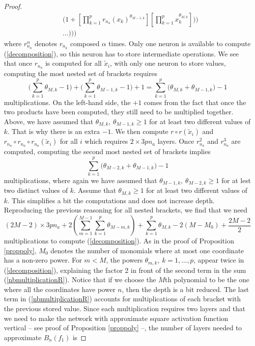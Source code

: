 \documentclass[anon,12pt]{colt2021} %
\begin{document}
\begin{proof}
\begin{align}
    & \bigg( 1 + \left[\prod_{k=1}^{p} r_{n_{a}}(x_{k})^{\theta_{M-1,k}} \right] \left[\prod_{k=1}^{p} x_{k}^{\theta_{M,k}} \right] \bigg)\bigg) \nonumber \\
    & \dots \bigg) \bigg) \bigg) \nonumber
\end{align}
where $r_{n_{a}}^{\alpha}$ denotes $r_{n_{a}}$ composed $\alpha$ times. Only one neuron is available to compute (\ref{decomposition}), so this neuron has to store intermediate operations. We see that once $r_{n_{a}}$ is computed for all $\tilde x_{i}$, with only one neuron to store values, computing the most nested set of brackets requires
\begin{equation*}
    \big( \sum_{k=1}^{p}\theta_{M,k} - 1 \big) + \big( \sum_{k=1}^{p}\theta_{M-1,k} -1 \big) +1 =  \sum_{k=1}^{p} \big( \theta_{M,k} + \theta_{M-1,k} \big) - 1
\end{equation*}
multiplications. On the left-hand side, the $+1$ comes from the fact that once the two products have been computed, they still need to be multiplied together. Above, we have assumed that $\theta_{M,k}, \ \theta_{M-1,k} \geq 1$ for at least two different values of $k$. That is why there is an extra $-1$. We then compute $r \circ r(\tilde x_{i})$ and $r_{n_{a}} \circ r_{n_{a}} \circ r_{n_{a}}(\tilde x_{i})$ for all $i$ which requires $2 \times 3pn_{a}$ layers. Once $r_{n_{a}}^{2}$ and $r_{n_{a}}^{3}$ are computed, computing the second most nested set of brackets implies
\begin{equation*}
    \sum_{k=1}^{p} \big( \theta_{M-2,k} + \theta_{M-1,k} \big) - 1
\end{equation*}
multiplications, where again we have assumed that $\theta_{M-1, k}, \ \theta_{M-2, k} \geq 1$ for at lest two distinct values of $k$. Assume that $\theta_{M,k} \geq 1$ for at least two different values of $k$. This simplifies a bit the computations and does not increase depth. Reproducing the previous reasoning for all nested brackets, we find that we need
\begin{equation} \label{nbmultiplicationR}
    (2M-2) \times 3pn_{a} + 2 \left(\sum_{m=1}^{M-1} \sum_{k=1}^{p} \theta_{M-m, k} \right) + \sum_{k=1}^{p} \theta_{M,k} - 2(M-M_{0}) +\frac{2M-2}{2}
\end{equation}
multiplications to compute (\ref{decomposition}). As in the proof of Proposition \ref{proppoly}, $M_{0}$ denotes the number of monomials where at most one coordinate has a non-zero power. For $m<M$, the powers $\theta_{m,k}, \ k=1, \dots, p$, appear twice in (\ref{decomposition}), explaining the factor 2 in front of the second term in the sum (\ref{nbmultiplicationR}). Notice that if we choose the $M$th polynomial to be the one where all the coordinates have power $n$, then the depth is a bit reduced. The last term in (\ref{nbmultiplicationR}) accounts for multiplications of each bracket with the previous stored value. Since each multiplication requires two layers and that we need to make the network with approximate square activation function vertical -- see proof of Proposition \ref{proppoly} --, the number of layers needed to approximate $B_{n}(f_{1})$ is

\end{proof}
\end{document}
